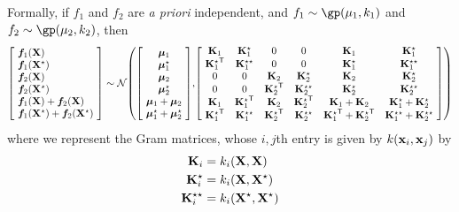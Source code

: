 Formally, if $f_1$ and $f_2$ are \emph{a priori} independent, and $f_1 \sim \gp( \mu_1, k_1)$ and ${f_2 \sim \gp( \mu_2, k_2)}$, then
%
\begin{align}
\left[ \! \begin{array}{l} 
\vf_1(\vX) \\
\vf_1(\vX^\star) \\
\vf_2(\vX) \\
\vf_2(\vX^\star) \\
\vf_1(\vX) + \vf_2(\vX) \\
\vf_1(\vX^\star) + \vf_2(\vX^\star)
\end{array} \! \right]
\sim
\Nt{
\left[ \! \begin{array}{c} \vmu_1 \\ \vmu_1^\star \\ \vmu_2 \\ \vmu_2^\star \\ \vmu_1 + \vmu_2 \\ \vmu_1^\star + \vmu_2^\star \end{array} \! \right] \!
}
{\! \left[ \! \begin{array}{cccccc} 
\vK_1 & \vK_1^\star & 0 & 0 & \vK_1 & \vK_1^\star \\ 
{\vK_1^\star}\tra & \vK_1^{\star\star} & 0 & 0 & \vK_1^\star & \vK_1^{\star\star} \\
0 & 0 & \vK_2 & {\vK_2^\star} & \vK_2 & \vK_2^\star \\ 
0 & 0 & {\vK_2^\star}\tra & \vK_2^{\star\star} & \vK_2^\star & \vK_2^{\star\star} \\
{\vK_1} & {\vK_1^\star}\tra & \vK_2 & {\vK_2^\star}\tra & \vK_1 + \vK_2 & \vK_1^\star + \vK_2^\star \\ 
{\vK_1^\star}\tra & \vK_1^{\star\star}  & {\vK_2^\star}\tra & \vK_2^{\star\star}  & {\vK_1^\star}\tra + {\vK_2^\star}\tra & \vK_1^{\star\star} + \vK_2^{\star\star}\\
\end{array} \! \right]
}
\end{align}
%
where we represent the Gram matrices, whose $i,j$th entry is given by $k({\bf{x}}_i, {\bf{x}}_j)$ by
%
\begin{align}
\mathbf{K}_i & = k_i( \mathbf{X}, \mathbf{X} ) \\
\mathbf{K}_i^\star & = k_i( \mathbf{X}, \mathbf{X}^\star ) \\
\mathbf{K}_i^{\star\star} & = k_i( \mathbf{X}^\star, \mathbf{X}^\star )
\end{align}

